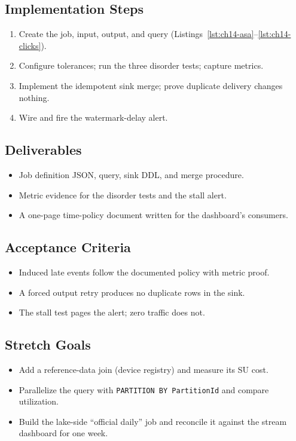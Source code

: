 \subsection*{Implementation Steps}
\begin{enumerate}
    \item Create the job, input, output, and query (Listings~\ref{lst:ch14-asa}--\ref{lst:ch14-clicks}).
    \item Configure tolerances; run the three disorder tests; capture metrics.
    \item Implement the idempotent sink merge; prove duplicate delivery changes nothing.
    \item Wire and fire the watermark-delay alert.
\end{enumerate}

\subsection*{Deliverables}
\begin{itemize}
    \item Job definition JSON, query, sink DDL, and merge procedure.
    \item Metric evidence for the disorder tests and the stall alert.
    \item A one-page time-policy document written for the dashboard's consumers.
\end{itemize}

\subsection*{Acceptance Criteria}
\begin{itemize}
    \item Induced late events follow the documented policy with metric proof.
    \item A forced output retry produces no duplicate rows in the sink.
    \item The stall test pages the alert; zero traffic does not.
\end{itemize}

\subsection*{Stretch Goals}
\begin{itemize}
    \item Add a reference-data join (device registry) and measure its SU cost.
    \item Parallelize the query with \texttt{PARTITION BY PartitionId} and compare utilization.
    \item Build the lake-side ``official daily'' job and reconcile it against the stream dashboard for one week.
\end{itemize}
